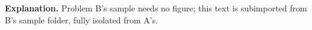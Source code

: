 \par\noindent\textbf{Explanation.} Problem B's sample needs no figure; this text
is subimported from B's sample folder, fully isolated from A's.
